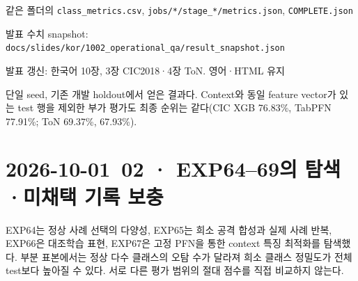 \par\noindent \textbullet\enspace 같은 폴더의 \texttt{class\_\allowbreak{}\allowbreak{}me\allowbreak{}trics.\allowbreak{}cs\allowbreak{}v}, \texttt{jobs/\allowbreak{}\allowbreak{}*/\allowbreak{}\allowbreak{}s\allowbreak{}tage\_\allowbreak{}\allowbreak{}*/\allowbreak{}\allowbreak{}m\allowbreak{}etrics.\allowbreak{}j\allowbreak{}son}, \texttt{COMPLETE\allowbreak{}.\allowbreak{}json}


\par\noindent \textbullet\enspace 발표 수치 snapshot: \texttt{docs/\allowbreak{}\allowbreak{}sli\allowbreak{}des/\allowbreak{}\allowbreak{}kor/\allowbreak{}\allowbreak{}1002\_\allowbreak{}\allowbreak{}ope\allowbreak{}rational\allowbreak{}\_\allowbreak{}\allowbreak{}qa/\allowbreak{}\allowbreak{}resu\allowbreak{}lt\_\allowbreak{}\allowbreak{}snaps\allowbreak{}hot.\allowbreak{}json\allowbreak{}}


\par\noindent \textbullet\enspace 발표 갱신: 한국어 10장, 3장 CIC2018·4장 ToN. 영어·HTML 유지


단일 seed, 기존 개발 holdout에서 얻은 결과다. Context와 동일 feature vector가 있는 test 행을 제외한 부가 평가도 최종 순위는 같다(CIC XGB 76.83\%, TabPFN 77.91\%; ToN 69.37\%, 67.93\%).



\section{2026-10-01~02 · EXP64--69의 탐색·미채택 기록 보충}
EXP64는 정상 사례 선택의 다양성, EXP65는 희소 공격 합성과 실제 사례 반복, EXP66은 대조학습 표현, EXP67은 고정 PFN을 통한 context 특징 최적화를 탐색했다. 부분 표본에서는 정상 다수 클래스의 오탐 수가 달라져 희소 클래스 정밀도가 전체 test보다 높아질 수 있다. 서로 다른 평가 범위의 절대 점수를 직접 비교하지 않는다.
